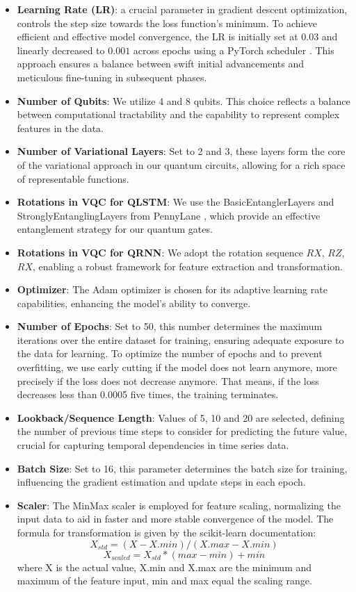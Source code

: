 \begin{itemize}
    \item \textbf{Learning Rate (LR)}: a crucial parameter in gradient descent optimization, controls the step size towards the loss function's minimum. To achieve efficient and effective model convergence, the LR is initially set at \(0.03\) and linearly decreased to \(0.001\) across epochs using a PyTorch scheduler \cite{paszke2019pytorch}. This approach ensures a balance between swift initial advancements and meticulous fine-tuning in subsequent phases.
    \item \textbf{Number of Qubits}: We utilize 4 and 8 qubits. This choice reflects a balance between computational tractability and the capability to represent complex features in the data.
    \item \textbf{Number of Variational Layers}: Set to 2 and 3, these layers form the core of the variational approach in our quantum circuits, allowing for a rich space of representable functions.
    \item \textbf{Rotations in VQC for QLSTM}: We use the BasicEntanglerLayers and StronglyEntanglingLayers from PennyLane \cite{bergholm2022pennylane}, which provide an effective entanglement strategy for our quantum gates.
    \item \textbf{Rotations in VQC for QRNN}: We adopt the rotation sequence $RX$, $RZ$, $RX$, enabling a robust framework for feature extraction and transformation.
    \item \textbf{Optimizer}: The Adam optimizer \cite{kingma2017adam} is chosen for its adaptive learning rate capabilities, enhancing the model's ability to converge.
    \item \textbf{Number of Epochs}: Set to 50, this number determines the maximum iterations over the entire dataset for training, ensuring adequate exposure to the data for learning. To optimize the number of epochs and to prevent overfitting, we use early cutting if the model does not learn anymore, more precisely if the loss does not decrease anymore. That means, if the loss decreases less than 0.0005 five times, the training terminates. 
    \item \textbf{Lookback/Sequence Length}: Values of 5, 10 and 20 are selected, defining the number of previous time steps to consider for predicting the future value, crucial for capturing temporal dependencies in time series data.
    \item \textbf{Batch Size}: Set to 16, this parameter determines the batch size for training, influencing the gradient estimation and update steps in each epoch.
    \item \textbf{Scaler}: The MinMax scaler \cite{scikit-learn} is employed for feature scaling, normalizing the input data to aid in faster and more stable convergence of the model.
    The formula for transformation is given by the scikit-learn \cite{scikit-learn} documentation: 
    \[X_{std} = (X - X.min) / (X.max - X.min)\]
    \[X_{scaled} = X_{std} * (max - min) + min\]
    where X is the actual value, X.min and X.max are the minimum and maximum of the feature input, min and max equal the scaling range.
\end{itemize}

